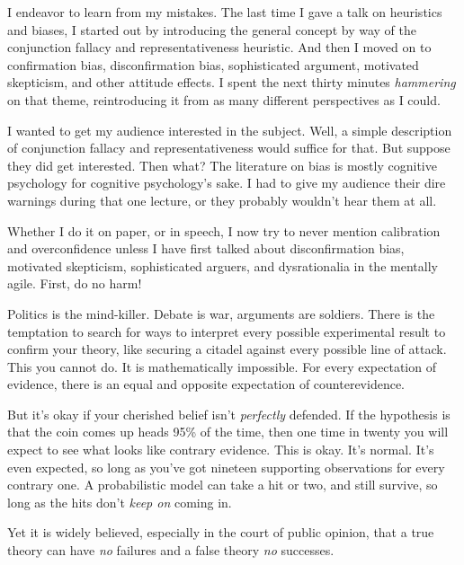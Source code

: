 {
 I endeavor to learn from my mistakes. The last time I gave a talk
on heuristics and biases, I started out by introducing the general
concept by way of the conjunction fallacy and representativeness
heuristic. And then I moved on to confirmation bias, disconfirmation
bias, sophisticated argument, motivated skepticism, and other attitude
effects. I spent the next thirty minutes \textit{hammering} on that
theme, reintroducing it from as many different perspectives as I
could.}

{
 I wanted to get my audience interested in the subject. Well, a
simple description of conjunction fallacy and representativeness would
suffice for that. But suppose they did get interested. Then what? The
literature on bias is mostly cognitive psychology for cognitive
psychology's sake. I had to give my audience their dire
warnings during that one lecture, or they probably
wouldn't hear them at all.}

{
 Whether I do it on paper, or in speech, I now try to never mention
calibration and overconfidence unless I have first talked about
disconfirmation bias, motivated skepticism, sophisticated arguers, and
dysrationalia in the mentally agile. First, do no harm!}

\myendsectiontext


\bigskip


{
 Politics is the mind-killer. Debate is war, arguments are
soldiers. There is the temptation to search for ways to interpret every
possible experimental result to confirm your theory, like securing a
citadel against every possible line of attack. This you cannot do. It
is mathematically impossible. For every expectation of evidence, there
is an equal and opposite expectation of counterevidence. }

{
 But it's okay if your cherished belief
isn't \textit{perfectly} defended. If the hypothesis is
that the coin comes up heads 95\% of the time, then one time in twenty
you will expect to see what looks like contrary evidence. This is okay.
It's normal. It's even expected, so
long as you've got nineteen supporting observations for
every contrary one. A probabilistic model can take a hit or two, and
still survive, so long as the hits don't \textit{keep
on} coming in.}

{
 Yet it is widely believed, especially in the court of public
opinion, that a true theory can have \textit{no} failures and a false
theory \textit{no} successes.}

